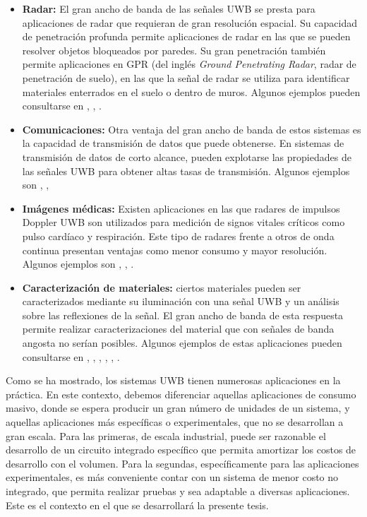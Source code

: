 \begin{itemize}
  \item \textbf{Radar:} El gran ancho de banda de las señales UWB se presta
        para aplicaciones de radar que requieran de gran resolución espacial. Su
        capacidad de penetración profunda permite aplicaciones de radar en las
        que se pueden resolver objetos bloqueados por paredes. Su gran
        penetración también permite aplicaciones en GPR (del inglés
        \textit{Ground Penetrating Radar}, radar de penetración de suelo), en
        las que la señal de radar se utiliza para identificar materiales
        enterrados en el suelo o dentro de muros. Algunos ejemplos
        pueden consultarse en \cite{morales2018}, \cite{savelyev2010},
        \cite{senapati2021}.
  \item \textbf{Comunicaciones:} Otra ventaja del gran ancho de banda de estos
        sistemas es la capacidad de transmisión de datos que puede obtenerse.  En
        sistemas de transmisión de datos de corto alcance, pueden explotarse las
        propiedades de las señales UWB para obtener altas tasas de transmisión.
        Algunos ejemplos son \cite{jaesang2004}, \cite{zhiquan2005},
        \cite{Heydari2005}
  \item \textbf{Imágenes médicas:} Existen aplicaciones en las que radares de
        impulsos Doppler UWB son utilizados para medición de signos vitales
        críticos como pulso cardíaco y respiración. Este tipo de radares frente
        a otros de onda continua presentan ventajas como menor consumo y mayor
        resolución. Algunos ejemplos son \cite{jalivand2011}, \cite{oloumi2020},
        \cite{jalivand2011_2}.
  \item \textbf{Caracterización de materiales:} ciertos materiales pueden ser
      caracterizados mediante su iluminación con una señal UWB y un análisis
        sobre las reflexiones de la señal. El gran ancho de banda de esta
        respuesta permite realizar caracterizaciones del material que con
        señales de banda angosta no serían posibles. Algunos ejemplos de estas
        aplicaciones pueden consultarse en \cite{altieri2017},
        \cite{Salman2008}, \cite{Bouza2023}, \cite{Muqaibel2003},
        \cite{salman2010performance}, \cite{Altieri2021}.
\end{itemize}

Como se ha mostrado, los sistemas UWB tienen numerosas aplicaciones en la
práctica. En este contexto, debemos diferenciar aquellas aplicaciones de consumo
masivo, donde se espera producir un gran número de unidades de un sistema, y
aquellas aplicaciones más específicas o experimentales, que no se desarrollan a
gran escala. Para las primeras, de escala industrial, puede ser razonable el
desarrollo de un circuito integrado específico que permita amortizar los costos
de desarrollo con el volumen. Para la segundas, específicamente para las
aplicaciones experimentales, es más conveniente contar con un sistema de menor
costo no integrado, que permita realizar pruebas y sea adaptable a diversas
aplicaciones. Este es el contexto en el que se desarrollará la presente tesis.

